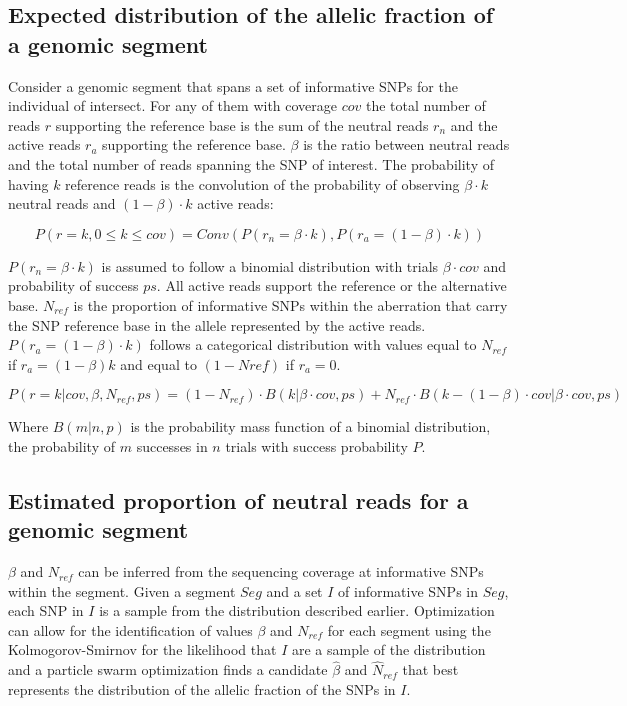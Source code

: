	\subsection{Expected distribution of the allelic fraction of a genomic segment}
	Consider a genomic segment that spans a set of informative SNPs for the individual of intersect.
	For any of them with coverage $cov$ the total number of reads $r$ supporting the reference base is the sum of the neutral reads $r_n$ and the active reads $r_a$ supporting the reference base.
	$\beta$ is the ratio between neutral reads and the total number of reads spanning the SNP of interest.
	The probability of having $k$ reference reads is the convolution of the probability of observing $\beta\cdot k$ neutral reads and $(1-\beta)\cdot k$ active reads:

	$$P(r = k, 0\le k\le cov) = Conv(P(r_n = \beta\cdot k), P(r_a = (1-\beta)\cdot k))$$

	$P(r_n = \beta\cdot k)$ is assumed to follow a binomial distribution with trials $\beta\cdot cov$ and probability of success $ps$.
	All active reads support the reference or the alternative base.
	$N_{ref}$ is the proportion of informative SNPs within the aberration that carry the SNP reference base in the allele represented by the active reads.
	$P(r_a = (1-\beta)\cdot k)$ follows a categorical distribution with values equal to $N_{ref}$ if $r_a = (1-\beta)k$ and equal to $(1-Nref)$ if $r_a = 0$.

	$$P(r = k|cov, \beta, N_{ref}, ps) = (1-N_{ref})\cdot B(k|\beta\cdot cov, ps) + N_{ref}\cdot B(k-(1-\beta)\cdot cov | \beta\cdot cov, ps)$$

	Where $B(m|n, p)$ is the probability mass function of a binomial distribution, the probability of $m$ successes in $n$ trials with success probability $P$.

	\subsection{Estimated proportion of neutral reads for a genomic segment}
	$\beta$ and $N_{ref}$ can be inferred from the sequencing coverage at informative SNPs within the segment.
	Given a segment $Seg$ and a set $I$ of informative SNPs in $Seg$, each SNP in $I$ is a sample from the distribution described earlier.
	Optimization can allow for the identification of values $\beta$ and $N_{ref}$ for each segment using the Kolmogorov-Smirnov for the likelihood that $I$ are a sample of the distribution and a particle swarm optimization finds a candidate $\hat{\beta}$ and $\hat{N}_{ref}$ that best represents the distribution of the allelic fraction of the SNPs in $I$.


